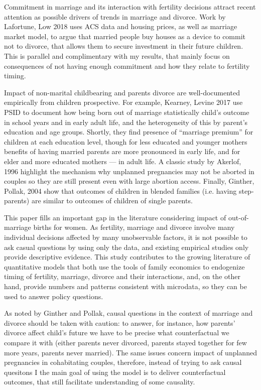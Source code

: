 \documentclass[12pt,letter]{article}
\begin{document}
Commitment in marriage and its interaction with fertility decisions attract recent attention as possible drivers of trends in marriage and divorce. Work by Lafortune, Low 2018\nocite{lafortune-1} uses ACS data and housing prices, as well as marriage market model, to argue that married people buy houses as a device to commit not to divorce, that allows them to secure investment in their future children. This is parallel and complimentary with my results, that mainly focus on consequences of not having enough commitment and how they relate to fertility timing. 

Impact of non-marital childbearing and parents divorce are well-documented empirically from children prospective. For example, Kearney, Levine 2017 use PSID to document how being born out of marriage statistically child's outcome in school years and in early adult life, and the heterogeneity of this by parent's education and age groups. Shortly, they find presence of ``marriage premium'' for children at each education level, though for less educated and younger mothers benefits of having married parents are more pronounced in early life, and for elder and more educated mothers --- in adult life. A classic study by Akerlof, 1996\nocite{akerlof} highlight the mechanism why unplanned pregnancies may not be aborted in couples so they are still present even with large abortion access. Finally, Ginther, Pollak, 2004 show that outcomes of children in blended families (i.e. having step-parents) are similar to outcomes of children of single parents. 

This paper fills an important gap in the literature considering impact of out-of-marriage births for women. As fertility, marriage and divorce involve many individual decisions affected by many unobservable factors, it is not possible to ask casual questions by using only the data, and existing empirical studies only provide descriptive evidence. This study contributes to the growing literature of quantitative models that both use the tools of family economics to endogenize timing of fertility, marriage, divorce and their interactions, and, on the other hand, provide numbers and patterns consistent with microdata, so they can be used to answer policy questions.

As noted by Ginther and Pollak, causal questions in the context of marriage and divorce should be taken with caution: to answer, for instance, how parents' divorce affect child's future we have to be precise what counterfactual we compare it with (either parents never divorced, parents stayed together for few more years, parents never married). The same issues concern impact of unplanned pregnancies in cohabitating couples, therefore, instead of trying to ask causal quesitons I the main goal of using the model is to deliver counterfactual outcomes, that still facilitate understanding of some causality.
\end{document}
